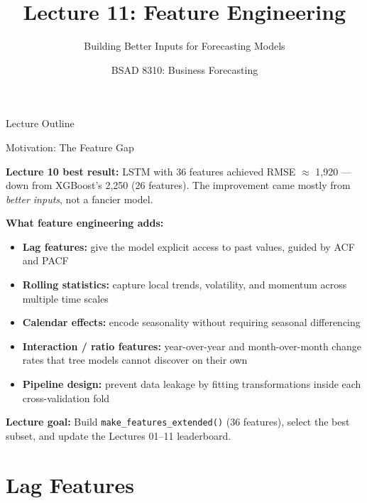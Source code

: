 \documentclass[aspectratio=169, 10pt]{beamer}
\title{Lecture 11: Feature Engineering}
\subtitle{Building Better Inputs for Forecasting Models}
\author{BSAD 8310: Business Forecasting}
\institute{University of Nebraska at Omaha}
\begin{document}

\begin{frame}
  \titlepage
\end{frame}

\begin{frame}{Lecture Outline}
  \tableofcontents
\end{frame}

\begin{frame}{Motivation: The Feature Gap}
  \begin{keybox}
    \textbf{Lecture 10 best result:}
    LSTM with 36 features achieved RMSE $\approx$ 1,920 ---
    down from XGBoost's 2,250 (26 features).
    The improvement came mostly from \emph{better inputs}, not a
    fancier model.
  \end{keybox}

  \medskip
  \textbf{What feature engineering adds:}
  \begin{itemize}
    \item \textbf{Lag features:} give the model explicit access to
          past values, guided by ACF and PACF
    \item \textbf{Rolling statistics:} capture local trends,
          volatility, and momentum across multiple time scales
    \item \textbf{Calendar effects:} encode seasonality without
          requiring seasonal differencing
    \item \textbf{Interaction / ratio features:} year-over-year
          and month-over-month change rates that tree models cannot
          discover on their own
    \item \textbf{Pipeline design:} prevent data leakage by fitting
          transformations inside each cross-validation fold
  \end{itemize}

  \medskip
  \textbf{Lecture goal:} Build \texttt{make\_features\_extended()}
  (36 features), select the best subset, and update the
  Lectures 01--11 leaderboard.
\end{frame}

\section{Lag Features}
\end{document}
